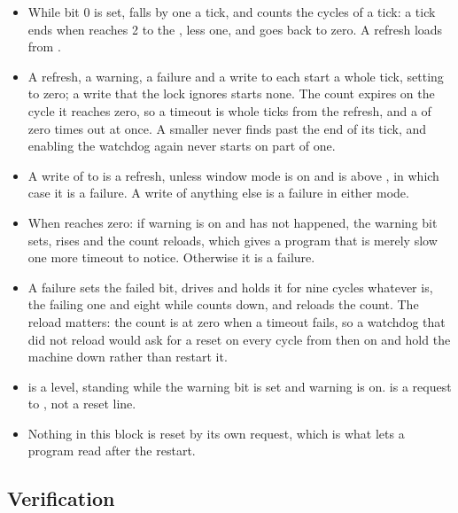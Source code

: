 \begin{itemize}
\item While  bit 0 is set,  falls by one a
tick, and  counts the cycles of a tick: a tick ends when
 reaches 2 to the , less one, and 
goes back to zero. A refresh loads  from .
\item A refresh, a warning, a failure and a write to  each
start a whole tick, setting  to zero; a write that the lock
ignores starts none. The count expires on the cycle it reaches zero,
so a timeout is  whole ticks from the refresh, and a
 of zero times out at once. A smaller 
never finds  past the end of its tick, and enabling the
watchdog again never starts on part of one.
\item A write of  to  is a refresh, unless window
mode is on and  is above , in which case it is
a failure. A write of anything else is a failure in either mode.
\item When  reaches zero: if warning is on and has not
happened, the warning bit sets,  rises and the count
reloads, which gives a program that is merely slow one more timeout to
notice. Otherwise it is a failure.
\item A failure sets the failed bit, drives  and holds it
for nine cycles whatever  is, the failing one and eight
while  counts down, and reloads the count. The reload matters: the count
is at zero when a timeout fails, so a watchdog that did not reload
would ask for a reset on every cycle from then on and hold the machine
down rather than restart it.
\item {} is a level, standing while the warning bit is set and
warning is on.  is a request to , not a reset
line.
\item Nothing in this block is reset by its own request, which is what
lets a program read  after the restart.
\end{itemize}

\subsection*{Verification}

